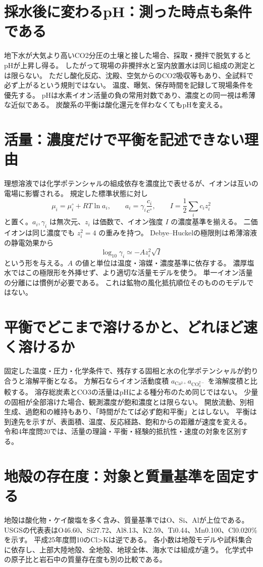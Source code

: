 \section{採水後に変わるpH：測った時点も条件である}
\label{theory:geochemistry:sampling}
地下水が大気より高いCO2分圧の土壌と接した場合、採取・攪拌で脱気するとpHが上昇し得る。
したがって現場の非攪拌水と室内放置水は同じ組成の測定とは限らない。
ただし酸化反応、沈殿、空気からのCO2吸収等もあり、全試料で必ず上がるという規則ではない。
温度、曝気、保存時間を記録して現場条件を優先する\cite{gc_hem}。
pHは水素イオン活量の負の常用対数であり、濃度との同一視は希薄な近似である。
炭酸系の平衡は酸化還元を伴わなくてもpHを変える。

\section{活量：濃度だけで平衡を記述できない理由}
\label{theory:geochemistry:activity}
理想溶液では化学ポテンシャルの組成依存を濃度比で表せるが、イオンは互いの電場に影響される。
規定した標準状態に対し
\[
 \mu_i=\mu_i^\circ+RT\ln a_i,\qquad a_i=\gamma_i\frac{c_i}{c^\circ},\qquad
 I=\frac12\sum_i c_i z_i^2
\]
と置く。\(a_i,\gamma_i\) は無次元、\(z_i\) は価数で、イオン強度 \(I\) の濃度基準を揃える。
二価イオンは同じ濃度でも \(z_i^2=4\) の重みを持つ。
Debye--Huckelの極限則は希薄溶液の静電効果から
\[
 \log_{10}\gamma_i\simeq-Az_i^2\sqrt I
\]
という形を与える。\(A\) の値と単位は温度・溶媒・濃度基準に依存する。
濃厚塩水ではこの極限形を外挿せず、より適切な活量モデルを使う。
単一イオン活量の分離には慣例が必要である\cite{gc_debye}。
これは鉱物の風化抵抗順位そのもののモデルではない。

\section{平衡でどこまで溶けるかと、どれほど速く溶けるか}
\label{theory:geochemistry:equilibrium}
固定した温度・圧力・化学条件で、残存する固相と水の化学ポテンシャルが釣り合うと溶解平衡となる。
方解石ならイオン活動度積 \(a_{\mathrm{Ca^{2+}}}a_{\mathrm{CO_3^{2-}}}\) を溶解度積と比較する。
溶存総炭素とCO3の活量はpHによる種分布のため同じではない。
少量の固相が全部溶けた場合、観測濃度が飽和濃度とは限らない。
開放流動、別相生成、過飽和の維持もあり、「時間がたてば必ず飽和平衡」とはしない。
平衡は到達先を示すが、表面積、温度、反応経路、飽和からの距離が速度を変える\cite{gc_hem}。
令和4年度問20では、活量の理論・平衡・経験的抵抗性・速度の対象を区別する。

\section{地殻の存在度：対象と質量基準を固定する}
\label{theory:geochemistry:crust}
地殻は酸化物・ケイ酸塩を多く含み、質量基準ではO、Si、Alが上位である。
USGSの代表表はO46.60、Si27.72、Al8.13、K2.59、Ti0.44、Mn0.100、Cl0.020\%を示す\cite{gc_crust}。
平成25年度問10のCl>Kは逆である。
各小数は地殻モデルや試料集合に依存し、上部大陸地殻、全地殻、地球全体、海水では組成が違う。
化学式中の原子比と岩石中の質量存在度も別の比較である。

